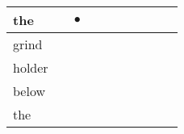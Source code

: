 \documentclass[landscape]{article}
\newcommand{\ssp}{\hspace{2pt}}
\newcommand{\mex}{\cellcolor{g}$\bullet$}
\begin{document}
\begin{tabular}{|l|p{10pt}|p{10pt}|p{10pt}|p{10pt}|p{10pt}|p{10pt}|p{10pt}|p{10pt}|p{10pt}|}
\hline
\ssp \cellcolor{ref1}the \ssp&\hspace{2pt}&\hspace{2pt}\mex&\hspace{2pt}&\hspace{2pt}&\hspace{2pt}&\hspace{2pt}&\hspace{2pt}&\hspace{2pt}&\hspace{2pt}\\
\hline
\ssp grind \ssp&\hspace{2pt}&\hspace{2pt}&\hspace{2pt}&\hspace{2pt}&\hspace{2pt}&\hspace{2pt}&\hspace{2pt}&\hspace{2pt}&\hspace{2pt}\\
\hline
\ssp holder \ssp&\hspace{2pt}&\hspace{2pt}&\hspace{2pt}&\hspace{2pt}&\hspace{2pt}&\hspace{2pt}&\hspace{2pt}&\hspace{2pt}&\hspace{2pt}\\
\hline
\ssp below \ssp&\hspace{2pt}&\hspace{2pt}&\hspace{2pt}&\hspace{2pt}&\hspace{2pt}&\hspace{2pt}&\hspace{2pt}&\hspace{2pt}&\hspace{2pt}\\
\hline
\ssp the \ssp&\hspace{2pt}&\hspace{2pt}&\hspace{2pt}&\hspace{2pt}&\hspace{2pt}&\hspace{2pt}&\hspace{2pt}&\hspace{2pt}&\hspace{2pt}\\

\end{tabular}
\end{document}
